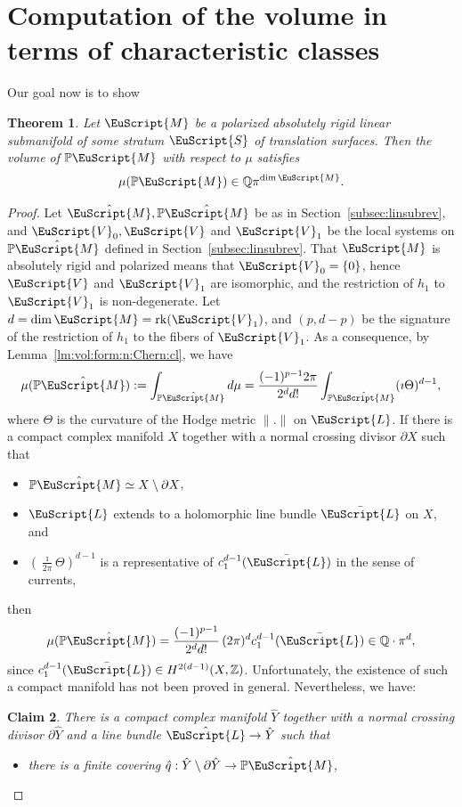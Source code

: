 \documentclass[10pt]{amsart}
\let\mathcal\EuScript
\theoremstyle{plain}
\newtheorem{Theorem}{Theorem}[section]
\newtheorem{Claim}[Theorem]{Claim}
\theoremstyle{definition}
\newcommand\Z{\mathbb{Z}}
\newcommand{\Q}{\mathbb{Q}}
\newcommand{\Pb}{\mathbb{P}}
\newcommand{\cL}{\mathcal{L}}
\newcommand{\cM}{\mathcal{M}}
\newcommand{\cS}{\mathcal{S}}
\newcommand{\cV}{\mathcal{V}}
\newcommand{\rk}{\mathrm{rk}}
\begin{document}
\section{Computation of the volume in terms of characteristic classes}\label{sec:rational:vol}
Our goal now is to show
\begin{Theorem}\label{th:vol:rational}
Let $\cM$ be a \emph{polarized absolutely rigid} linear submanifold of some stratum $\cS$ of translation surfaces.
Then the volume of $\Pb\cM$ with respect to $\mu$ satisfies
\[
\mu(\Pb\cM)\in \Q\pi^{\dim\cM}.
\]
\end{Theorem}
\begin{proof}
Let $\hat{\cM}, \Pb\hat{\cM}$ be as in Section~\ref{subsec:linsubrev}, and $\cV_0, \cV$ and $\cV_1$ be the local systems on $\Pb\hat\cM$ defined in Section~\ref{subsec:linsubrev}.
That $\cM$ is absolutely rigid and polarized means that $\cV_0=\{0\}$, hence $\cV$ and $\cV_1$ are isomorphic, and the restriction of $h_1$ to $\cV_1$ is non-degenerate. Let $d=\dim\cM=\rk(\cV_1)$, and $(p,d-p)$ be the signature of the restriction of $h_1$ to the fibers of $\cV_1$. As a consequence, by Lemma~\ref{lm:vol:form:n:Chern:cl}, we have
\[
\mu(\Pb\hat{\cM}):=\int_{\Pb\hat{\cM}}d\mu=\frac{(-1)^{p-1}2\pi}{2^dd!}\int_{\Pb\hat{\cM}}(\imath\Theta)^{d-1},
\]
where $\Theta$ is the curvature of the Hodge metric $\|.\|$ on $\cL$. If there is a compact complex manifold $X$ together with a normal crossing divisor $\partial X$ such that
\begin{itemize}
\item $\Pb\hat{\cM}\simeq X\setminus \partial X$,

\item $\cL$ extends to a holomorphic line bundle $\bar{\cL}$ on $X$, and

\item $(\frac{\imath}{2\pi}\Theta)^{d-1}$ is a representative of $c_1^{d-1}(\bar{\cL})$ in the sense of currents,
\end{itemize}
then
\[
\mu(\Pb\hat{\cM})=\frac{(-1)^{p-1}}{2^dd!}\,(2\pi)^{d}c_1^{d-1}(\bar{\cL}) \in \Q\cdot\pi^d,
\]
since $c_1^{d-1}(\bar{\cL}) \in H^{2(d-1)}(X,\Z)$.
Unfortunately, the existence of such a compact manifold has not been proved in general.
Nevertheless, we have:
\begin{Claim}\label{cl:vol:Chern:cls}
There is a compact complex manifold $\hat{Y}$ together with a normal crossing divisor $\partial \hat{Y}$ and a line bundle $\hat{\cL}\to \hat{Y}$ such that
\begin{itemize}
\item there is a finite covering $\hat{q}: \hat{Y}\setminus\partial \hat{Y} \to \Pb\hat{\cM}$,


\end{itemize}
\end{Claim}
\end{proof}
\end{document}
